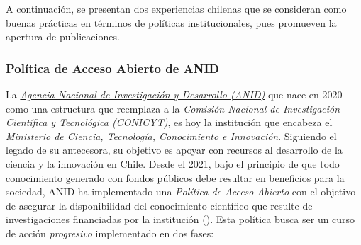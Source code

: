 \documentclass[
  spanish,
  a4paper,
  oneside]{scrbook}
\begin{document}
A continuación, se presentan dos experiencias chilenas que se consideran
como buenas prácticas en términos de políticas institucionales, pues
promueven la apertura de publicaciones.

\subsubsection*{\texorpdfstring{\textbf{Política de Acceso Abierto de
ANID}}{Política de Acceso Abierto de ANID}}\label{poluxedtica-de-acceso-abierto-de-anid}

La \href{https://www.anid.cl/}{\emph{Agencia Nacional de Investigación y
Desarrollo (ANID)}} que nace en 2020 como una estructura que reemplaza a
la \emph{Comisión Nacional de Investigación Científica y Tecnológica
(CONICYT)}, es hoy la institución que encabeza el \emph{Ministerio de
Ciencia, Tecnología, Conocimiento e Innovación}. Siguiendo el legado de
su antecesora, su objetivo es apoyar con recursos al desarrollo de la
ciencia y la innovación en Chile. Desde el 2021, bajo el principio de
que todo conocimiento generado con fondos públicos debe resultar en
beneficios para la sociedad, ANID ha implementado una \emph{Política de
Acceso Abierto} con el objetivo de asegurar la disponibilidad del
conocimiento científico que resulte de investigaciones financiadas por
la institución
(). Esta política busca ser
un curso de acción \emph{progresivo} implementado en dos fases:
\end{document}
